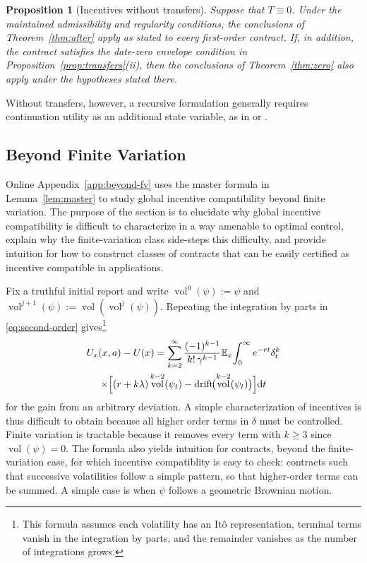 \documentclass[12pt]{article}
\newtheorem{prop}{Proposition}
\DeclareMathOperator{\drift}{drift}
\DeclareMathOperator{\vol}{vol}
\newcommand{\E}{\mathbb{E}}
\begin{document}
\begin{prop}[Incentives without transfers]\label{prop:no-transfers}
Suppose that \(T\equiv0\). Under the
maintained admissibility and regularity conditions, the conclusions of
Theorem~\ref{thm:after} apply as stated to every first-order contract. If,
in addition, the contract satisfies the date-zero envelope condition in
Proposition~\ref{prop:transfers}(ii), then the conclusions of
Theorem~\ref{thm:zero} also apply under the hypotheses stated
there.
\end{prop}

Without transfers, however, a recursive formulation generally requires continuation utility as an additional state variable, as in \cite{williams2011persistent} or \cite{bloedel2023persistent}.

\subsection{Beyond Finite Variation}
\label{sub:beyond-fv}


Online Appendix~\ref{app:beyond-fv} uses the master formula in
Lemma~\ref{lem:master} to study global incentive compatibility beyond
finite variation. The purpose of the section is to elucidate why global incentive compatibility is difficult to characterize in a way amenable to optimal control, 
explain why the finite-variation class side-steps this difficulty, and provide
intuition for how to construct classes of contracts that can be easily certified as incentive compatible in applications.


Fix a truthful initial report and
write \(\vol^0(\psi):=\psi\) and
\(\vol^{j+1}(\psi):=\vol(\vol^j(\psi))\).
Repeating the integration by parts in \eqref{eq:second-order}
gives\footnote{This formula assumes each volatility has an It\^{o} representation, terminal terms vanish in the integration by parts,
and the remainder vanishes as the number of integrations grows.}
\begin{multline}\label{eq:cascade}
  U_x(x,a)-U(x)
  =\sum_{k=2}^{\infty}\frac{(-1)^{k-1}}{k!\,\gamma^{k-1}}
    \E_x\!\int_0^\infty e^{-rt}\delta_t^k\\
  \times\Bigl[(r+k\lambda)\vol^{k-2}(\psi_t)
    -\drift\!\bigl(\vol^{k-2}(\psi_t)\bigr)\Bigr]\dd t
\end{multline}
for the gain from an arbitrary deviation. A simple characterization of incentives is thus difficult to obtain because all higher order terms in $\delta$ must be controlled. Finite variation is tractable because it removes every term
with \(k\geq3\) since \(\vol(\psi)=0\). The formula also yields intuition for contracts, beyond the finite-variation case, for which incentive compatiblity is easy to check: contracts such that successive
volatilities follow a simple pattern, so that higher-order terms can be summed. A simple case is when $\psi$ follows a geometric Brownian motion. 
\end{document}

